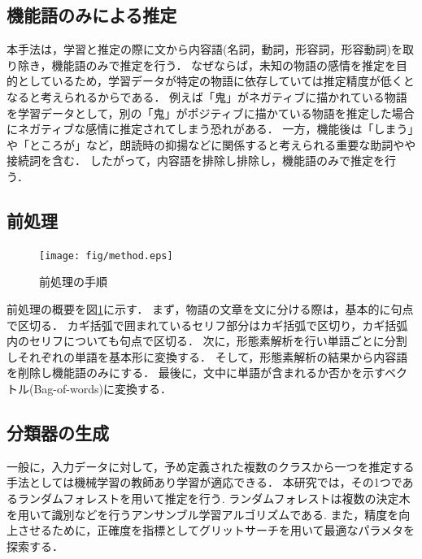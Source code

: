\subsection{機能語のみによる推定}
本手法は，学習と推定の際に文から内容語(名詞，動詞，形容詞，形容動詞)を取り除き，機能語のみで推定を行う．
なぜならば，未知の物語の感情を推定を目的としているため，学習データが特定の物語に依存していては推定精度が低くとなると考えられるからである．
例えば「鬼」がネガティブに描かれている物語を学習データとして，別の「鬼」がポジティブに描かている物語を推定した場合にネガティブな感情に推定されてしまう恐れがある．
一方，機能後は「しまう」や「ところが」など，朗読時の抑揚などに関係すると考えられる重要な助詞やや接続詞を含む．
したがって，内容語を排除し排除し，機能語のみで推定を行う．

\subsection{前処理}
\begin{figure}[h]
  \begin{center}
    \texttt{[image: fig/method.eps]}
    \caption{前処理の手順}
    \label{fig:pre}
  \end{center}
\end{figure}

前処理の概要を図\ref{fig:pre}に示す．
まず，物語の文章を文に分ける際は，基本的に句点で区切る．
カギ括弧で囲まれているセリフ部分はカギ括弧で区切り，カギ括弧内のセリフについても句点で区切る．
次に，形態素解析を行い単語ごとに分割しそれぞれの単語を基本形に変換する．
そして，形態素解析の結果から内容語を削除し機能語のみにする．
最後に，文中に単語が含まれるか否かを示すベクトル(Bag-of-words)に変換する．

\subsection{分類器の生成}
一般に，入力データに対して，予め定義された複数のクラスから一つを推定する手法としては機械学習の教師あり学習が適応できる．
本研究では，その1つであるランダムフォレストを用いて推定を行う.
ランダムフォレストは複数の決定木を用いて識別などを行うアンサンブル学習アルゴリズムである.
また，精度を向上させるために，正確度を指標としてグリットサーチを用いて最適なパラメタを探索する．

